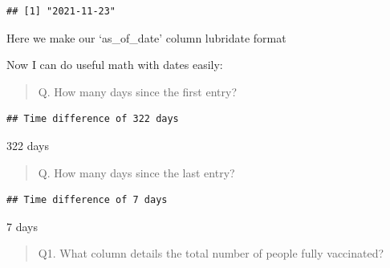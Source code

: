 \documentclass[
]{article}
\newenvironment{Shaded}{\begin{snugshade}}{\end{snugshade}}
\newcommand{\CommentTok}[1]{\textcolor[rgb]{0.56,0.35,0.01}{\textit{#1}}}
\newcommand{\DecValTok}[1]{\textcolor[rgb]{0.00,0.00,0.81}{#1}}
\newcommand{\FunctionTok}[1]{\textcolor[rgb]{0.00,0.00,0.00}{#1}}
\newcommand{\NormalTok}[1]{#1}
\newcommand{\OtherTok}[1]{\textcolor[rgb]{0.56,0.35,0.01}{#1}}
\newcommand{\SpecialCharTok}[1]{\textcolor[rgb]{0.00,0.00,0.00}{#1}}
\begin{document}
\begin{verbatim}
## [1] "2021-11-23"
\end{verbatim}

Here we make our `as\_of\_date' column lubridate format

\begin{Shaded}
\end{Shaded}

Now I can do useful math with dates easily:

\begin{quote}
Q. How many days since the first entry?
\end{quote}

\begin{Shaded}
\end{Shaded}

\begin{verbatim}
## Time difference of 322 days
\end{verbatim}

322 days

\begin{quote}
Q. How many days since the last entry?
\end{quote}

\begin{Shaded}
\end{Shaded}

\begin{verbatim}
## Time difference of 7 days
\end{verbatim}

7 days

\begin{quote}
Q1. What column details the total number of people fully vaccinated?
\end{quote}
\end{document}
